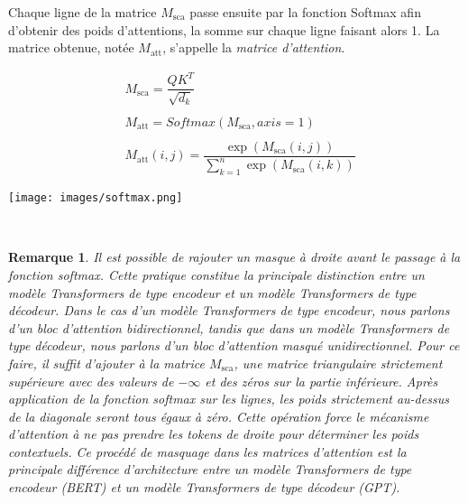 \documentclass[12pt]{article}
\newtheorem{rmq}{Remarque}
\theoremstyle{definition}
\begin{document}
Chaque ligne de la matrice \(M_{\text{sca}}\) passe ensuite par la fonction Softmax afin d'obtenir des poids d'attentions, la somme sur chaque ligne faisant alors 1. La matrice obtenue, notée \(M_{\text{att}}\), s'appelle la \emph{matrice d'attention}. 

\begin{minipage}[t]{1\textwidth}
\begin{minipage}[c]{0.25\textwidth}
	
	\begin{align*}
		&M_{\text{sca}} = \dfrac{QK^T}{\sqrt{d_k}}\\\\
		&M_{\text{att}} = Softmax(M_{\text{sca}},axis = 1)\\\\
		&M_{\text{att}}(i,j) = \dfrac{\exp(M_{\text{sca}}(i,j))}{\displaystyle\sum_{k=1}^{n}\exp(M_{\text{sca}}(i,k))}	
	\end{align*}

	
\end{minipage}\hfil\begin{minipage}[c]{0.6\textwidth}
	\texttt{[image: images/softmax.png]}	
\end{minipage}
\hfil\\[1cm]
\end{minipage}




\begin{rmq}
	Il est possible de rajouter un masque à droite avant le passage à la fonction softmax. Cette pratique constitue la principale distinction entre un modèle Transformers de type encodeur et un modèle Transformers de type décodeur. Dans le cas d'un modèle Transformers de type encodeur, nous parlons d'un bloc d'attention bidirectionnel, tandis que dans un modèle Transformers de type décodeur, nous parlons d'un bloc d'attention masqué unidirectionnel.  Pour ce faire, il suffit d'ajouter à la matrice \(M_{\text{sca}}\), une matrice triangulaire strictement supérieure avec des valeurs de \(-\infty\) et des zéros sur la partie inférieure. Après application de la fonction softmax sur les lignes, les poids strictement au-dessus de la diagonale seront tous égaux à zéro. Cette opération force le mécanisme d'attention à ne pas prendre les tokens de droite pour déterminer les poids contextuels. Ce procédé de masquage dans les matrices d'attention est la principale différence d'architecture entre un modèle Transformers de type encodeur (BERT) et un modèle Transformers de type décodeur (GPT).
	
\end{rmq}
\end{document}
